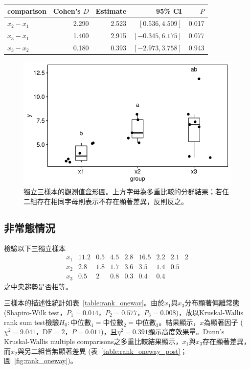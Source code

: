 \documentclass[12pt]{article}
\renewcommand{\tablename}{表}
\renewcommand{\figurename}{圖}
\newcommand*{\figref}[1]{\figurename~\ref{#1}}
\newcommand*{\tableref}[1]{\tablename~\ref{#1}}
\begin{document}
\begin{table}[htbp]
	\centering
	\begin{tabular}{lrrrr}
	\hline
	comparison & Cohen's $D$ & Estimate & 95\% CI & $P$ \\ 
	\hline
	$x_2-x_1$ & 2.290 & 2.523 & $[0.536, 4.509]$ & 0.017 \\ 
	$x_3-x_1$ & 1.400 & 2.915 & $[-0.345, 6.175]$ & 0.077 \\ 
	$x_3-x_2$ & 0.180 & 0.393 & $[-2.973, 3.758]$ & 0.943 \\ 
	\hline
	\end{tabular}
	\label{table:Welch_ANOVA_post}
\end{table}

\begin{figure}[htbp]
	\centering
	\includegraphics[]{Welch_ANOVA.pdf}
	\caption{獨立三樣本的觀測值盒形圖。上方字母為多重比較的分群結果；若任二組存在相同字母則表示不存在顯著差異，反則反之。}
	\label{fig:Welch_ANOVA}
\end{figure}

\subsection{非常態情況}
檢驗以下三獨立樣本
\[
\begin{matrix}
x_1 & 11.2 & 0.5 & 4.5 & 2.8 & 16.5 & 2.2 & 2.1 & 2  \\
x_2 & 2.8 & 1.8 & 1.7 & 3.6 & 3.5 & 1.4 & 0.5 & \\
x_3 & 0.5 & 2 & 0.8 & 0.3 & 0.4 & 0.4 & &
\end{matrix}
\]
之中央趨勢是否相等。

三樣本的描述性統計如\tableref{table:rank_oneway}。由於$x_1$與$x_3$分布顯著偏離常態 (Shapiro-Wilk test，$P_1 = 0.014$，$P_2 = 0.577$，$P_3 = 0.008$)，故以Kruskal-Wallis rank sum test檢驗$H_0:\text{中位數}_1 = \text{中位數}_2 = \text{中位數}_3$。結果顯示，$x$為顯著因子 ($\chi^2 = 9.041$，$\text{DF} = 2$，$P = 0.011$)，且$\eta^2 = 0.391$顯示高度效果量。Dunn's Kruskal-Wallis multiple comparisons之多重比較結果顯示，$x_1$與$x_3$存在顯著差異，而$x_2$與另二組皆無顯著差異 (\tableref{table:rank_oneway_post}；\figref{fig:rank_oneway})。
\end{document}

